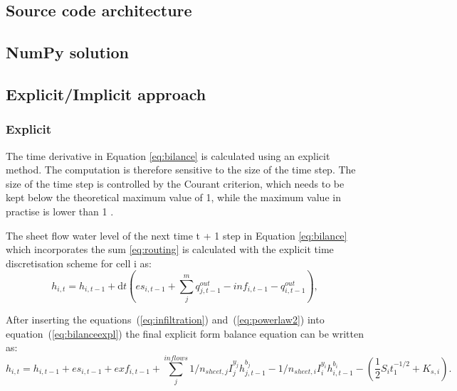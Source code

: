     \subsection{Source code architecture}

    \subsection{NumPy solution}

    \subsection{Explicit/Implicit approach}

        \subsubsection{Explicit}
            The time derivative in Equation \ref{eq:bilance} is calculated using an
            explicit method. The computation is therefore sensitive to the size of the time
            step. The size of the time step is controlled by the Courant criterion, which
            needs to be kept below the theoretical maximum value of 1, while the maximum
            value in practise is lower than 1 
            \cite{zhang1989modeling, esteves2000overland}.


            The sheet flow water level of the next time t + 1 step in Equation
            \ref{eq:bilance} which incorporates the sum \ref{eq:routing} is calculated with the
            explicit time discretisation scheme for cell i as:
            \begin{equation} 
            h_{i,t} =h_{i,t-1} + \mathrm{d}t (es_{i,t-1} + \sum_j^m q^{out}_{j,t-1}-
            inf_{i,t-1} - q^{out}_{i,t-1}),
            \label{eq:bilanceexpl}
            \end{equation}


           After inserting the equations~(\ref{eq:infiltration})
           and~(\ref{eq:powerlaw2}) into equation~(\ref{eq:bilanceexpl}) the
           final explicit form balance equation can be written as:
            \begin{dmath}
              h_{i,t} = h_{i,t-1} +
              es_{i,t-1}  + exf_{i,t-1} +  \sum_{j}^{inflows}
              1/n_{sheet,j}I_j^{y_j} h_{j,t-1}^{b_j} -
              1/n_{sheet,i}I_i^{y_i}h_{i,t-1}^{b_i} - ( 
              \frac{1}{2}S_it_1^{-1/2}+K_{s,i}).
            \end{dmath}


